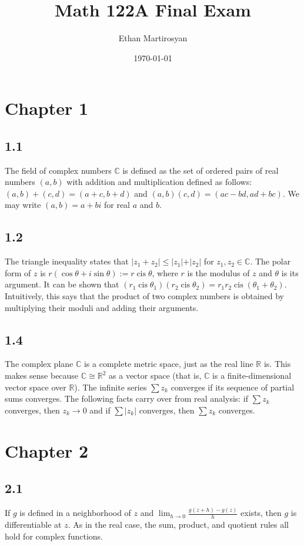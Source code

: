 \documentclass[12pt]{article}
\newcommand{\cc}{{\mathbb C}}
\newcommand{\rr}{{\mathbb R}}
\DeclareMathOperator{\cis}{cis}
\begin{document}
 
\title{Math 122A Final Exam}
\author{Ethan Martirosyan}
\date{\today}
\maketitle
{}
\hfuzz=50pt
\section*{Chapter 1}
\subsection*{1.1}
The field of complex numbers $\mathbb{C}$ is defined as the set of ordered pairs of real numbers $(a,b)$ with addition and multiplication defined as follows:
\((a,b) + (c,d) = (a+c,b+d)\) and \(
(a,b)(c,d) = (ac-bd,ad+bc) \). We may write $(a,b) = a+bi$ for real $a$ and $b$.
\subsection*{1.2}
The triangle inequality states that \(\vert z_1 + z_2 \vert \leq \vert z_1 \vert + \vert z_2 \vert\) for $z_1, z_2 \in \cc$. The polar form of $z$ is $r (\cos \theta + i\sin \theta) := r\cis \theta$, where $r$ is the modulus of $z$ and $\theta$ is its argument. It can be shown that $(r_1\cis \theta_1) (r_2 \cis \theta_2) = r_1r_2\cis(\theta_1+\theta_2)$. Intuitively, this says that the product of two complex numbers is obtained by multiplying their moduli and adding their arguments.
\subsection*{1.4}
The complex plane $\cc$ is a complete metric space, just as the real line $\rr$ is. This makes sense because $\cc \cong \rr^2$ as a vector space (that is, $\cc$ is a finite-dimensional vector space over $\rr$). The infinite series $\sum z_k$ converges if its sequence of partial sums converges. The following facts carry over from real analysis: if $\sum z_k$ converges, then $z_k \rightarrow 0$ and if $\sum \vert z_k \vert$ converges, then $\sum z_k$ converges.
\section*{Chapter 2}
\subsection*{2.1}
If $g$ is defined in a neighborhood of $z$ and \(\lim_{h \rightarrow 0} \frac{g(z+h) - g(z)}{h}\) exists, then $g$ is differentiable at $z$. As in the real case, the sum, product, and quotient rules all hold for complex functions.
\end{document}
